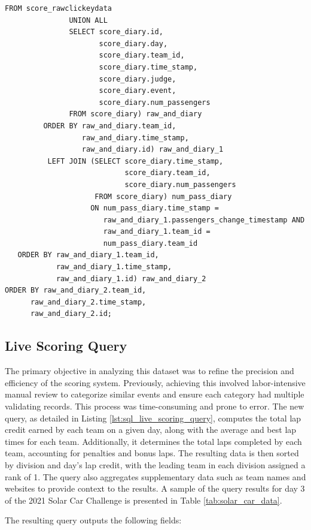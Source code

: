 \documentclass[11pt]{article}
\begin{document}
\begin{lstlisting}[style=sql, caption={Full Audit query}, label={lst:sql_audit_query}]
               FROM score_rawclickeydata
               UNION ALL
               SELECT score_diary.id,
                      score_diary.day,
                      score_diary.team_id,
                      score_diary.time_stamp,
                      score_diary.judge,
                      score_diary.event,
                      score_diary.num_passengers
               FROM score_diary) raw_and_diary
         ORDER BY raw_and_diary.team_id,
                  raw_and_diary.time_stamp,
                  raw_and_diary.id) raw_and_diary_1
          LEFT JOIN (SELECT score_diary.time_stamp,
                            score_diary.team_id,
                            score_diary.num_passengers
                     FROM score_diary) num_pass_diary
                    ON num_pass_diary.time_stamp =
                       raw_and_diary_1.passengers_change_timestamp AND
                       raw_and_diary_1.team_id =
                       num_pass_diary.team_id
   ORDER BY raw_and_diary_1.team_id,
            raw_and_diary_1.time_stamp,
            raw_and_diary_1.id) raw_and_diary_2
ORDER BY raw_and_diary_2.team_id,
      raw_and_diary_2.time_stamp,
      raw_and_diary_2.id;
\end{lstlisting}


\pagebreak
\subsection{Live Scoring Query}

The primary objective in analyzing this dataset was to refine the precision and efficiency of the scoring system. Previously, achieving this involved labor-intensive manual review to categorize similar events and ensure each category had multiple validating records. This process was time-consuming and prone to error. The new query, as detailed in Listing \ref{lst:sql_live_scoring_query}, computes the total lap credit earned by each team on a given day, along with the average and best lap times for each team. Additionally, it determines the total laps completed by each team, accounting for penalties and bonus laps. The resulting data is then sorted by division and day's lap credit, with the leading team in each division assigned a rank of 1. The query also aggregates supplementary data such as team names and websites to provide context to the results. A sample of the query results for day 3 of the 2021 Solar Car Challenge is presented in Table \ref{tab:solar_car_data}.

The resulting query outputs the following fields:
\end{document}
